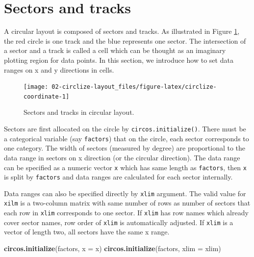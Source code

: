 \documentclass[]{book}
\newenvironment{Shaded}{\begin{snugshade}}{\end{snugshade}}
\newcommand{\KeywordTok}[1]{\textcolor[rgb]{0.13,0.29,0.53}{\textbf{#1}}}
\newcommand{\DataTypeTok}[1]{\textcolor[rgb]{0.13,0.29,0.53}{#1}}
\newcommand{\NormalTok}[1]{#1}
\theoremstyle{definition}
\theoremstyle{definition}
\theoremstyle{remark}
\begin{document}
\section{Sectors and tracks}\label{sectors-and-tracks}

A circular layout is composed of sectors and tracks. As illustrated in
Figure \ref{fig:circlize-coordinate}, the red circle is one track and
the blue represents one sector. The intersection of a sector and a track
is called a cell which can be thought as an imaginary plotting region
for data points. In this section, we introduce how to set data ranges on
x and y directions in cells.

\begin{figure}

{\centering \texttt{[image: 02-circlize-layout\_files/figure-latex/circlize-coordinate-1]} 

}

\caption{Sectors and tracks in circular layout.}\label{fig:circlize-coordinate}
\end{figure}

Sectors are first allocated on the circle by
\texttt{circos.initialize()}. There must be a categorical variable (say
\texttt{factors}) that on the circle, each sector corresponds to one
category. The width of sectors (measured by degree) are proportional to
the data range in sectors on x direction (or the circular direction).
The data range can be specified as a numeric vector \texttt{x} which has
same length as \texttt{factors}, then \texttt{x} is split by
\texttt{factors} and data ranges are calculated for each sector
internally.

Data ranges can also be specified directly by \texttt{xlim} argument.
The valid value for \texttt{xilm} is a two-column matrix with same
number of rows as number of sectors that each row in \texttt{xlim}
corresponds to one sector. If \texttt{xlim} has row names which already
cover sector names, row order of \texttt{xlim} is automatically
adjusted. If \texttt{xlim} is a vector of length two, all sectors have
the same x range.

\begin{Shaded}
\begin{Highlighting}[]
\KeywordTok{circos.initialize}\NormalTok{(factors, }\DataTypeTok{x =}\NormalTok{ x)}
\KeywordTok{circos.initialize}\NormalTok{(factors, }\DataTypeTok{xlim =}\NormalTok{ xlim)}
\end{Highlighting}
\end{Shaded}
\end{document}
